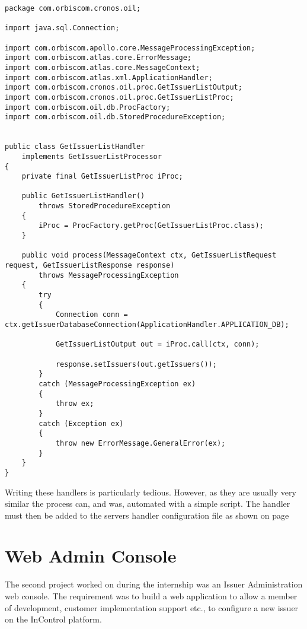\documentclass[a4paper, 11pt, titlepage]{article}
\begin{document}
\begin{verbatim} 
package com.orbiscom.cronos.oil; 
 
import java.sql.Connection; 
 
import com.orbiscom.apollo.core.MessageProcessingException; 
import com.orbiscom.atlas.core.ErrorMessage; 
import com.orbiscom.atlas.core.MessageContext; 
import com.orbiscom.atlas.xml.ApplicationHandler; 
import com.orbiscom.cronos.oil.proc.GetIssuerListOutput; 
import com.orbiscom.cronos.oil.proc.GetIssuerListProc; 
import com.orbiscom.oil.db.ProcFactory; 
import com.orbiscom.oil.db.StoredProcedureException; 
 
 
public class GetIssuerListHandler 
	implements GetIssuerListProcessor 
{ 
	private final GetIssuerListProc iProc; 
 
	public GetIssuerListHandler() 
		throws StoredProcedureException 
	{ 
		iProc = ProcFactory.getProc(GetIssuerListProc.class); 
	} 
 
	public void process(MessageContext ctx, GetIssuerListRequest request, GetIssuerListResponse response) 
		throws MessageProcessingException 
	{ 
		try 
		{ 
			Connection conn = ctx.getIssuerDatabaseConnection(ApplicationHandler.APPLICATION_DB); 
 
			GetIssuerListOutput out = iProc.call(ctx, conn); 
 
			response.setIssuers(out.getIssuers()); 
		} 
		catch (MessageProcessingException ex) 
		{ 
			throw ex; 
		} 
		catch (Exception ex) 
		{ 
			throw new ErrorMessage.GeneralError(ex); 
		} 
	} 
} 
\end{verbatim} 
Writing these handlers is particularly tedious. However, as they are usually very similar the process can, and was, automated with a simple script. 
The handler must then be added to the servers handler configuration file as shown on page \pageref{handlerset} 
 
\cite{OIL} 
 
\section{Web Admin Console} 
The second project worked on during the internship was an Issuer Administration web console. The requirement was to build a web application to allow a member of development, customer implementation support etc., to configure a new issuer on the InControl platform. 
 
\end{document}
